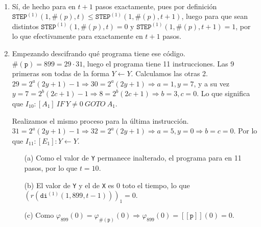 \documentclass[twoside]{article}
\begin{document}
\begin{solucion}\
\begin{enumerate}
\item Sí, de hecho para en $t+1$ pasos exactamente, pues por definición $\texttt{STEP}^{(1)}(1, \#(p), t) \leq \texttt{STEP}^{(1)}(1, \#(p), t + 1)$, luego para que sean distintos $\texttt{STEP}^{(1)}(1, \#(p), t)=0$ y $\texttt{STEP}^{(1)}(1, \#(p), t + 1)=1$, por lo que efectivamente para exactamente en $t+1$ pasos. 
\item Empezando descifrando qué programa tiene ese código. $\#(\texttt{p})=899=29\cdot 31$, luego el programa tiene 11 instrucciones. Las 9 primeras son todas de la forma $Y\leftarrow Y$. Calculamos las otras 2. $29=2^a(2y+1)-1\Rightarrow 30=2^a(2y+1)\Rightarrow a=1, y=7$, y a su vez $y=7=2^b(2c+1)-1\Rightarrow 8=2^b(2c+1)\Rightarrow b=3, c=0$. Lo que significa que $I_{10}: [A_1]\ IF\ Y\neq 0\ GOTO\ A_1$.

Realizamos el mismo proceso para la última instrucción. $31=2^a(2y+1)-1\Rightarrow 32=2^a(2y+1)\Rightarrow a=5, y=0\Rightarrow b=c=0$. Por lo que $I_{11}: [E_1]: Y\leftarrow Y$. 
\begin{itemize}
\item[(a)] Como el valor de \texttt{Y} permanece inalterado, el programa para en 11 pasos, por lo que $t=10$.
\item[(b)] El valor de \texttt{Y} y el de \texttt{X} es 0 toto el tiempo, lo que $(r(\texttt{di}^{(1)}(1, 899, t - 1)))_1=0$.
\item[(c)] Como $\varphi_{899}(0)=\varphi_{\#(\texttt{p})}(0)\Rightarrow\varphi_{899}(0)=[\![\texttt{p}]\!](0)=0$.
\end{itemize}
\end{enumerate}
\end{solucion}
\end{document}
